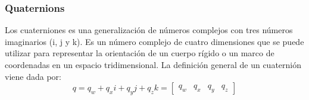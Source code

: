 \begin{frame}

\end{frame}

\begin{frame}
    \frametitle{Quaternions}
    Los cuaterniones es una generalización de números complejos con tres números imaginarios (i, j y k). Es un número complejo de cuatro dimensiones que se puede utilizar para representar la orientación de un cuerpo rígido o un marco de coordenadas en un espacio tridimensional. La definición general de un cuaternión viene dada por:
    \begin{equation*}
        q = q_w + q_x i + q_y j + q_z k = \begin{bmatrix} q_w & q_x & q_y & q_z\end{bmatrix}
    \end{equation*}
\end{frame}

